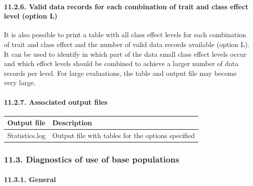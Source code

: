 \paragraph{11.2.6. Valid data records for each combination of trait and
class effect level (option L)}\label{Desc09}

It is also possible to print a table with all class effect levels for
each combination of trait and class effect and the number of valid data
records available (option L). It can be used to identify in which part
of the data small class effect levels occur and which effect levels
should be combined to achieve a larger number of data records per level.
For large evaluations, the table and output file may become very large.

\paragraph{11.2.7. Associated output files}\label{Desc10}

{\def\LTcaptype{none} %
\begin{longtable}[]{@{}ll@{}}
\toprule\noalign{}
Output file & Description \\
\midrule\noalign{}
\endhead
\bottomrule\noalign{}
\endlastfoot
Statistics.log & Output file with tables for the options specified \\
\end{longtable}
}

\subsubsection{11.3. Diagnostics of use of base
populations}\label{Desc11}

\paragraph{11.3.1. General}\label{Desc12}

